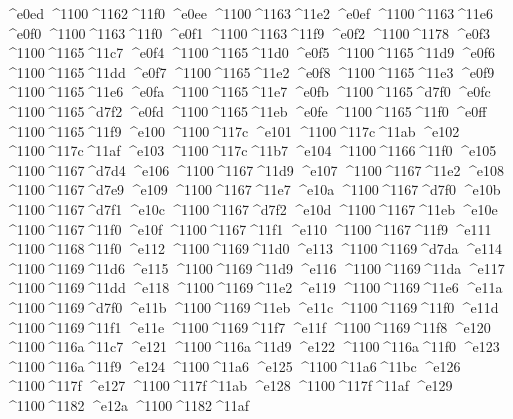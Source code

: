 \checkit ^^^^e0ed ^^^^1100^^^^1162^^^^11f0
\checkit ^^^^e0ee ^^^^1100^^^^1163^^^^11e2
\checkit ^^^^e0ef ^^^^1100^^^^1163^^^^11e6
\checkit ^^^^e0f0 ^^^^1100^^^^1163^^^^11f0
\checkit ^^^^e0f1 ^^^^1100^^^^1163^^^^11f9
\checkit ^^^^e0f2 ^^^^1100^^^^1178
\checkit ^^^^e0f3 ^^^^1100^^^^1165^^^^11c7
\checkit ^^^^e0f4 ^^^^1100^^^^1165^^^^11d0
\checkit ^^^^e0f5 ^^^^1100^^^^1165^^^^11d9
\checkit ^^^^e0f6 ^^^^1100^^^^1165^^^^11dd
\checkit ^^^^e0f7 ^^^^1100^^^^1165^^^^11e2
\checkit ^^^^e0f8 ^^^^1100^^^^1165^^^^11e3
\checkit ^^^^e0f9 ^^^^1100^^^^1165^^^^11e6
\checkit ^^^^e0fa ^^^^1100^^^^1165^^^^11e7
\checkit ^^^^e0fb ^^^^1100^^^^1165^^^^d7f0
\checkit ^^^^e0fc ^^^^1100^^^^1165^^^^d7f2
\checkit ^^^^e0fd ^^^^1100^^^^1165^^^^11eb
\checkit ^^^^e0fe ^^^^1100^^^^1165^^^^11f0
\checkit ^^^^e0ff ^^^^1100^^^^1165^^^^11f9
\checkit ^^^^e100 ^^^^1100^^^^117c
\checkit ^^^^e101 ^^^^1100^^^^117c^^^^11ab
\checkit ^^^^e102 ^^^^1100^^^^117c^^^^11af
\checkit ^^^^e103 ^^^^1100^^^^117c^^^^11b7
\checkit ^^^^e104 ^^^^1100^^^^1166^^^^11f0
\checkit ^^^^e105 ^^^^1100^^^^1167^^^^d7d4
\checkit ^^^^e106 ^^^^1100^^^^1167^^^^11d9
\checkit ^^^^e107 ^^^^1100^^^^1167^^^^11e2
\checkit ^^^^e108 ^^^^1100^^^^1167^^^^d7e9
\checkit ^^^^e109 ^^^^1100^^^^1167^^^^11e7
\checkit ^^^^e10a ^^^^1100^^^^1167^^^^d7f0
\checkit ^^^^e10b ^^^^1100^^^^1167^^^^d7f1
\checkit ^^^^e10c ^^^^1100^^^^1167^^^^d7f2
\checkit ^^^^e10d ^^^^1100^^^^1167^^^^11eb
\checkit ^^^^e10e ^^^^1100^^^^1167^^^^11f0
\checkit ^^^^e10f ^^^^1100^^^^1167^^^^11f1
\checkit ^^^^e110 ^^^^1100^^^^1167^^^^11f9
\checkit ^^^^e111 ^^^^1100^^^^1168^^^^11f0
\checkit ^^^^e112 ^^^^1100^^^^1169^^^^11d0
\checkit ^^^^e113 ^^^^1100^^^^1169^^^^d7da
\checkit ^^^^e114 ^^^^1100^^^^1169^^^^11d6
\checkit ^^^^e115 ^^^^1100^^^^1169^^^^11d9
\checkit ^^^^e116 ^^^^1100^^^^1169^^^^11da
\checkit ^^^^e117 ^^^^1100^^^^1169^^^^11dd
\checkit ^^^^e118 ^^^^1100^^^^1169^^^^11e2
\checkit ^^^^e119 ^^^^1100^^^^1169^^^^11e6
\checkit ^^^^e11a ^^^^1100^^^^1169^^^^d7f0
\checkit ^^^^e11b ^^^^1100^^^^1169^^^^11eb
\checkit ^^^^e11c ^^^^1100^^^^1169^^^^11f0
\checkit ^^^^e11d ^^^^1100^^^^1169^^^^11f1
\checkit ^^^^e11e ^^^^1100^^^^1169^^^^11f7
\checkit ^^^^e11f ^^^^1100^^^^1169^^^^11f8
\checkit ^^^^e120 ^^^^1100^^^^116a^^^^11c7
\checkit ^^^^e121 ^^^^1100^^^^116a^^^^11d9
\checkit ^^^^e122 ^^^^1100^^^^116a^^^^11f0
\checkit ^^^^e123 ^^^^1100^^^^116a^^^^11f9
\checkit ^^^^e124 ^^^^1100^^^^11a6
\checkit ^^^^e125 ^^^^1100^^^^11a6^^^^11bc
\checkit ^^^^e126 ^^^^1100^^^^117f
\checkit ^^^^e127 ^^^^1100^^^^117f^^^^11ab
\checkit ^^^^e128 ^^^^1100^^^^117f^^^^11af
\checkit ^^^^e129 ^^^^1100^^^^1182
\checkit ^^^^e12a ^^^^1100^^^^1182^^^^11af
